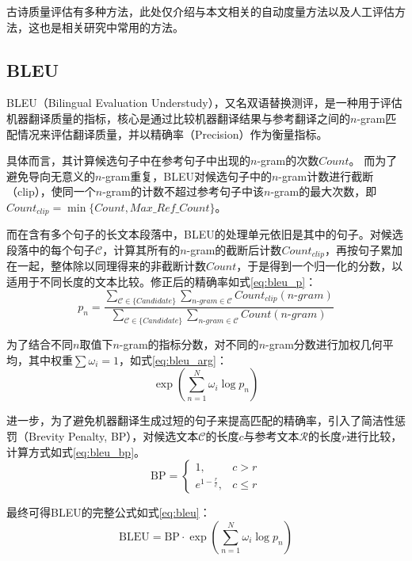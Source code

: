 古诗质量评估有多种方法，此处仅介绍与本文相关的自动度量方法以及人工评估方法，这也是相关研究中常用的方法。

\subsection{BLEU} \label{sec:bleu}
BLEU（Bilingual Evaluation Understudy），又名双语替换测评，是一种用于评估机器翻译质量的指标，核心是通过比较机器翻译结果与参考翻译之间的$n$-gram匹配情况来评估翻译质量，并以精确率（Precision）作为衡量指标。

具体而言，其计算候选句子中在参考句子中出现的$n$-gram的次数$Count$。
而为了避免导向无意义的$n$-gram重复，BLEU对候选句子中的$n$-gram计数进行截断（clip），使同一个$n$-gram的计数不超过参考句子中该$n$-gram的最大次数，即$Count_{clip}=\min\{Count,Max\_Ref\_Count\}$。

而在含有多个句子的长文本段落中，BLEU的处理单元依旧是其中的句子。对候选段落中的每个句子$\mathcal C$，计算其所有的$n$-gram的截断后计数$Count_{clip}$，再按句子累加在一起，整体除以同理得来的非截断计数$Count$，于是得到一个归一化的分数，以适用于不同长度的文本比较。修正后的精确率如式\eqref{eq:bleu_p}：
\begin{equation}
    p_n=\frac{\sum_{\mathcal C \in\{Candidate\}} \sum_{n\mbox{-}gram\in\mathcal C} Count_{clip}(n\mbox{-}gram)}{\sum_{\mathcal C \in\{Candidate\}} \sum_{n\mbox{-}gram\in\mathcal C} Count(n\mbox{-}gram)} \label{eq:bleu_p}
\end{equation}

为了结合不同$n$取值下$n$-gram的指标分数，对不同的$n$-gram分数进行加权几何平均，其中权重$\sum\omega_i=1$，如式\eqref{eq:bleu_arg}：
\begin{equation}
    \exp\left(\sum^N_{n=1} \omega_i\log p_n\right) \label{eq:bleu_arg}
\end{equation}

进一步，为了避免机器翻译生成过短的句子来提高匹配的精确率，引入了简洁性惩罚（Brevity Penalty, BP），对候选文本$\mathcal C$的长度$c$与参考文本$\mathcal R$的长度$r$进行比较，计算方式如式\eqref{eq:bleu_bp}。
\begin{equation}
    \mathrm{BP}=\left\{
    \begin{array}{lr}
        1, &c>r \\
        e^{1-\frac rc}, & c\leq r
    \end{array}
    \right. 
    \label{eq:bleu_bp}
\end{equation}

最终可得BLEU的完整公式如式\eqref{eq:bleu}：
\begin{equation}
    \mathrm{BLEU}=\mathrm{BP}\cdot\exp\left(\sum^N_{n=1} \omega_i\log p_n\right) \label{eq:bleu}
\end{equation}


